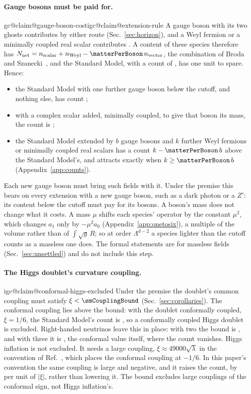 \documentclass[aps,prd,reprint,amsmath,amssymb,superscriptaddress,nofootinbib]{revtex4-2}
\makeatletter
\newcommand{\Nnet}{N_{\mathrm{net}}}
\newcommand{\claim}[1]{\expandafter\xdef\csname igc@claim@#1\endcsname{\thesection}}
\makeatother
\begin{document}
\paragraph{Gauge bosons must be paid for.}
\claim{gauge-boson-cost}\claim{extension-rule}%
A gauge boson with its two ghosts contributes \weightGaugeField{} by either route
(Sec.~\ref{sec:horizon}), and a Weyl fermion or a minimally coupled real scalar
contributes \weightScalar. A content of these species therefore has
$\Nnet=n_{\text{scalar}}+n_{\text{Weyl}}-\matterPerBoson\,n_{\text{vector}}$, the
combination of Broda and Szanecki~\cite{BrodaSzanecki2009}, and the Standard Model,
with a count of \smNet, has one unit to spare. Hence:
\begin{itemize}
\item the Standard Model with one further gauge boson below the cutoff, and nothing
else, has count \smPlusOneBoson;
\item with a complex scalar added, minimally coupled, to give that boson its mass, the
count is \smPlusBosonAndHiggs;
\item the Standard Model extended by $b$ gauge bosons and $k$ further Weyl fermions or
minimally coupled real scalars has a count $k-\matterPerBoson\,b$ above the Standard
Model's, and attracts exactly when $k\ge\matterPerBoson\,b$
(Appendix~\ref{app:counts}).
\end{itemize}
Each new gauge boson must bring \matterPerBosonSpelled{} such fields with it. Under the
premise this bears on every extension with a new gauge boson, such as a dark photon or
a $Z'$: its content below the cutoff must pay for its bosons. A boson's mass does not
change what it costs. A mass $\mu$ shifts each species' operator by the constant
$\mu^2$, which changes $a_1$ only by $-\mu^2a_0$ (Appendix~\ref{app:onetosix}), a
multiple of the volume rather than of $\int\!\sqrt g\,R$; so at order $\Lambda^{d-2}$ a
species lighter than the cutoff counts as a massless one does. The formal statements are
for massless fields (Sec.~\ref{sec:unsettled}) and do not include this step.

\paragraph{The Higgs doublet's curvature coupling.}
\claim{conformal-higgs-excluded}%
Under the premise the doublet's common coupling must satisfy $\xi<\smCouplingBound$
(Sec.~\ref{sec:corollaries}). The conformal coupling lies above the bound: with the
doublet conformally coupled, $\xi=1/6$, the Standard Model's count is
\smConformalCount, so a conformally coupled Higgs doublet is excluded. Right-handed
neutrinos leave this in place: with two the bound is \nuTwoCouplingBound, and with three
it is \nuThreeCouplingBound, the conformal value itself, where the count vanishes.
Higgs inflation is not excluded. It needs a large coupling, $\xi\approx49000\sqrt\lambda$
in the convention of Ref.~\cite{BezrukovShaposhnikov2008}, which places the conformal
coupling at $-1/6$. In this paper's convention the same coupling is large and negative,
and it raises the count, by \smCouplingSlope{} per unit of $|\xi|$, rather than lowering
it. The bound excludes large couplings of the conformal sign, not Higgs inflation's.
\end{document}
